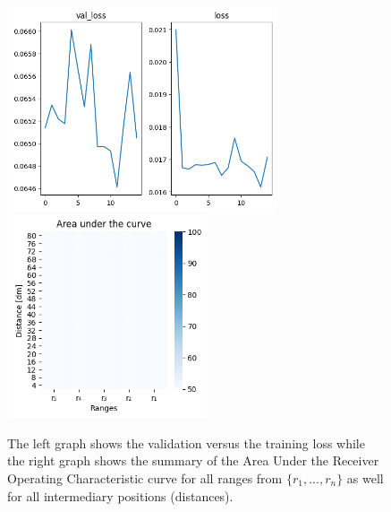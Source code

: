 \begin{multicols}{2}
\begin{itemize}
\end{itemize}
\end{multicols}\begin{figure}[H]%
\centering
\includegraphics[width=8cm,height=6cm]{3_models/models_39/graph_39.png}
\hspace{0.2 cm}
\includegraphics[width=6cm,height=6cm]{4_plots/plots_39/AUC_39.png}
\caption{The left graph shows the validation versus the training loss while the right graph shows the summary of the Area Under the Receiver Operating Characteristic curve for all ranges from $\{r_{1}, ... ,r_{n}\}$ as well for all intermediary positions (distances).}
\label{auc_39}
\end{figure}


\newpage


